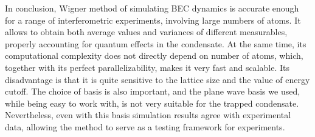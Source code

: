 \documentclass[aps,prl,twocolumn,showpacs,amsmath,amssymb,superscriptaddress]{revtex4-1}
\begin{document}
In conclusion, Wigner method of simulating BEC dynamics
is accurate enough for a range of interferometric experiments,
involving large numbers of atoms.
It allows to obtain both average values and variances of different measurables,
properly accounting for quantum effects in the condensate.
At the same time, its computational complexity does not directly depend on number of atoms,
which, together with its perfect parallelizability, makes it very fast and scalable.
Its disadvantage is that it is quite sensitive to the lattice size and the value of energy cutoff.
The choice of basis is also important, and the plane wave basis we used,
while being easy to work with, is not very suitable for the trapped condensate.
Nevertheless, even with this basis simulation results agree with experimental data,
allowing the method to serve as a testing framework for experiments.


\end{document}
